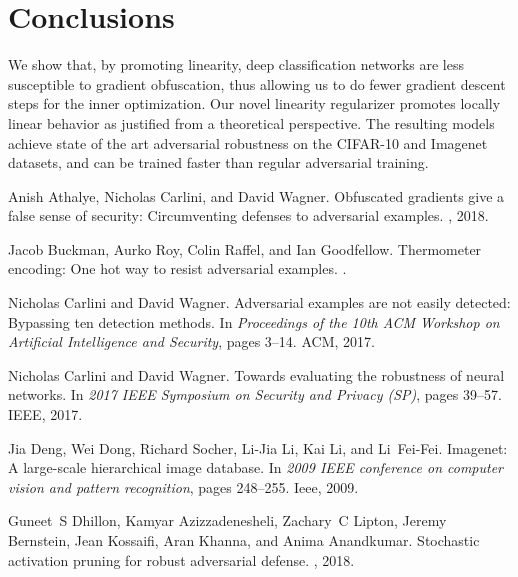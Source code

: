 \documentclass{article}
\theoremstyle{plain}
\theoremstyle{definition}
\theoremstyle{remark}
\begin{document}
 \section{Conclusions}
We show that, by promoting linearity, deep classification networks are less susceptible to gradient obfuscation, thus allowing us to do fewer gradient descent steps for the inner optimization. Our novel linearity regularizer promotes locally linear behavior as justified from a theoretical perspective. The resulting models achieve state of the art adversarial robustness on the CIFAR-10 and Imagenet datasets, and can be trained  faster than regular adversarial training.

%
 

\begin{thebibliography}{10}

Anish Athalye, Nicholas Carlini, and David Wagner.
\newblock Obfuscated gradients give a false sense of security: Circumventing
  defenses to adversarial examples.
, 2018.

Jacob Buckman, Aurko Roy, Colin Raffel, and Ian Goodfellow.
\newblock Thermometer encoding: One hot way to resist adversarial examples.
.

Nicholas Carlini and David Wagner.
\newblock Adversarial examples are not easily detected: Bypassing ten detection
  methods.
\newblock In {\em Proceedings of the 10th ACM Workshop on Artificial
  Intelligence and Security}, pages 3--14. ACM, 2017.

Nicholas Carlini and David Wagner.
\newblock Towards evaluating the robustness of neural networks.
\newblock In {\em 2017 IEEE Symposium on Security and Privacy (SP)}, pages
  39--57. IEEE, 2017.

Jia Deng, Wei Dong, Richard Socher, Li-Jia Li, Kai Li, and Li~Fei-Fei.
\newblock Imagenet: A large-scale hierarchical image database.
\newblock In {\em 2009 IEEE conference on computer vision and pattern
  recognition}, pages 248--255. Ieee, 2009.

Guneet~S Dhillon, Kamyar Azizzadenesheli, Zachary~C Lipton, Jeremy Bernstein,
  Jean Kossaifi, Aran Khanna, and Anima Anandkumar.
\newblock Stochastic activation pruning for robust adversarial defense.
, 2018.


\end{thebibliography}
\end{document}

